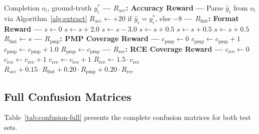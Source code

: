 \documentclass{article} %
\begin{document}
\begin{algorithm}[htbp]
\caption{Hybrid Multi-Component Reward (Framework~3)}
\label{alg:hybrid-reward}
\begin{algorithmic}[1]
\REQUIRE Completion $o_i$, ground-truth $y^*_i$
\STATE \textbf{--- $R_{\text{acc}}$: Accuracy Reward ---}
\STATE Parse $\hat{y}_i$ from $o_i$ via Algorithm~\ref{alg:extract}
\STATE $R_{\text{acc}} \leftarrow +20$ if $\hat{y}_i = y^*_i$, else $-8$
\STATE
\STATE \textbf{--- $R_{\text{fmt}}$: Format Reward ---}
\STATE $s \leftarrow 0$
    \STATE $s \leftarrow s + 2.0$
\ELSE
    \STATE $s \leftarrow s - 3.0$
\ENDIF
{}
    \STATE $s \leftarrow s + 0.5$
\ENDIF
{}
    \STATE $s \leftarrow s + 0.5$
\ENDIF
{}
    \STATE $s \leftarrow s + 0.5$
\ENDIF
\STATE $R_{\text{fmt}} \leftarrow s$
\STATE
\STATE \textbf{--- $R_{\text{pmp}}$: PMP Coverage Reward ---}
\STATE $c_{\text{pmp}} \leftarrow 0$
        \STATE $c_{\text{pmp}} \leftarrow c_{\text{pmp}} + 1$
    \ENDIF
\ENDFOR
{}
    \STATE $c_{\text{pmp}} \leftarrow c_{\text{pmp}} + 1.0$ 
\ENDIF
\STATE $R_{\text{pmp}} \leftarrow c_{\text{pmp}}$
\STATE
\STATE \textbf{--- $R_{\text{rce}}$: RCE Coverage Reward ---}
\STATE $c_{\text{rce}} \leftarrow 0$
        \STATE $c_{\text{rce}} \leftarrow c_{\text{rce}} + 1$
    \ENDIF
\ENDFOR
{}
    \STATE $c_{\text{rce}} \leftarrow c_{\text{rce}} + 1$ 
\ENDIF
\STATE $R_{\text{rce}} \leftarrow 1.5 \cdot c_{\text{rce}}$
\STATE
\RETURN $R_{\text{acc}} + 0.15 \cdot R_{\text{fmt}} + 0.20 \cdot R_{\text{pmp}} + 0.20 \cdot R_{\text{rce}}$
\end{algorithmic}
\end{algorithm}

\subsection{Full Confusion Matrices}

Table~\ref{tab:confusion-full} presents the complete confusion matrices for both test sets.
\end{document}
